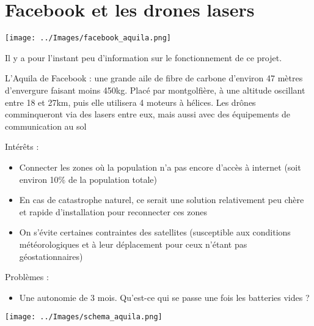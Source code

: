 \documentclass[a4paper,11pt]{report}
\begin{document}
\section{Facebook et les drones lasers}
\begin{flushleft}
\texttt{[image: ../Images/facebook\_aquila.png]}
\end{flushleft}
Il y a pour l'instant peu d'information sur le fonctionnement de ce projet.

L'Aquila de Facebook : une grande aile de fibre de carbone d'environ 47 mètres d'envergure faisant moins 450kg. Placé par montgolfière, à une altitude oscillant entre 18 et 27km, puis elle utilisera 4 moteurs à hélices. Les drônes comminqueront via des lasers entre eux, mais aussi avec des équipements de communication au sol

Intérêts :
\begin{itemize}
  \item Connecter les zones où la population n'a pas encore d'accès à internet (soit environ 10\% de la population totale)
  \item En cas de catastrophe naturel, ce serait une solution relativement peu chère et rapide d'installation pour reconnecter ces zones
  \item On s'évite certaines contraintes des satellites (susceptible aux conditions météorologiques et à leur déplacement pour ceux n'étant pas géostationnaires)
\end{itemize}

Problèmes :
\begin{itemize}
  \item Une autonomie de 3 mois. Qu'est-ce qui se passe une fois les batteries vides ?
\end{itemize}
\texttt{[image: ../Images/schema\_aquila.png]}
\end{document}
